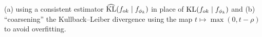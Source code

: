 (a) using a consistent estimator $\mathrm{\widehat{KL}}(f_{ok} \mid f_{\phi_{k}})$ in place of $\mathrm{KL}(f_{ok} \mid f_{\phi_{k}})$ and
(b) ``coarsening'' the Kullback--Leiber divergence using the map $t \mapsto \max(0, t - \rho)$ to avoid overfitting.




